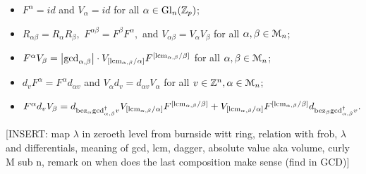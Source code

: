 \begin{thm}
\begin{itemize}
 \item $F^\alpha = id$ and $V_\alpha = id$ for all $\alpha \in \operatorname{Gl}_n(\mathbb{Z}_p)$;
 \item $R_{\alpha\beta} = R_\alpha R_\beta,$ $F^{\alpha\beta} = F^\beta F^\alpha,$ and $V_{\alpha\beta} = V_\alpha V_\beta$ for all $\alpha, \beta \in \mathcal{M}_n$;
 \item $F^\alpha V_\beta = \left\vert\mathrm{gcd}_{\alpha,\beta}\right\vert \cdot V_{[\mathrm{lcm}_{\alpha,\beta} / \alpha]}F^{[\mathrm{lcm}_{\alpha,\beta} / \beta]}$ %
    for all $\alpha, \beta \in \mathcal{M}_n$;
 \item $d_v F^\alpha = F^\alpha d_{\alpha v}$ and $V_\alpha d_v = d_{\alpha v} V_\alpha$ for all $v \in \mathbb{Z}^n, \alpha \in \mathcal{M}_n$;
 \item $F^\alpha d_v V_\beta = d_{\bez_{\alpha}\gcd_{\alpha,\beta}^\dagger v} %
    V_{[\lcm_{\alpha,\beta} / \alpha]} F^{[\lcm_{\alpha,\beta} / \beta]} + \\ %
    V_{[\lcm_{\alpha,\beta} / \alpha]} F^{[\lcm_{\alpha,\beta} / \beta]}%
    d_{\bez_{\beta}\gcd_{\alpha,\beta}^\dagger v}.$
\end{itemize}
[INSERT: map $\lambda$ in zeroeth level from burnside witt ring, relation with frob, $\lambda$ and
differentials, meaning of gcd, lcm, dagger, absolute value aka volume, curly M sub n, remark on
when does the last composition make sense (find in GCD)]
\end{thm}
%
%
\begin{defn}\label{def_bwc}%
\\
\end{defn}
%
%
